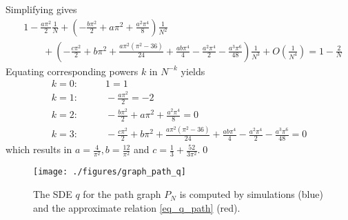 \documentclass{comnet}%
\begin{document}
Simplifying gives
\begin{align*}
	&1 - \frac{a \pi^2}{2} \frac{1}{N} + \left( -\frac{b \pi^2}{2} + a \pi^2 + \frac{a^2 \pi^4}{8} \right) \frac{1}{N^2} \\
	&\qquad + \left( -\frac{c \pi^2}{2} + b \pi^2 + \frac{a\pi^2(\pi^2-36)}{24} + \frac{ab\pi^4}{4} - \frac{a^2 \pi^4}{2} - \frac{a^3 \pi^6}{48} \right) \frac{1}{N^3} + O\left(\frac{1}{N^4}\right) = 1 - \frac{2}{N}
\end{align*}
Equating corresponding powers $k$ in $N^{-k}$ yields
\begin{align*}
	k=0: &\qquad 1 = 1 \\
	k=1: &\qquad -\frac{a \pi^2}{2} = -2 \\
	k=2: &\qquad -\frac{b \pi^2}{2} + a \pi^2 + \frac{a^2 \pi^4}{8} = 0 \\
	k=3: &\qquad -\frac{c \pi^2}{2} + b \pi^2 + \frac{a\pi^2(\pi^2-36)}{24} + \frac{ab\pi^4}{4} - \frac{a^2 \pi^4}{2} - \frac{a^3 \pi^6}{48} = 0
\end{align*}
which results in $a = \frac{4}{\pi^2}, b= \frac{12}{\pi^2}$ and $c=\frac{1}{3} + \frac{52}{3\pi^{2}}$.\hfill\qed


\begin{figure}[H]
	\centering
	\texttt{[image: ./figures/graph\_path\_q]}
	\caption{The SDE $q$ for the path graph $P_N$ is computed by simulations (blue) and the approximate relation \eqref{eq_q_path} (red).}
	\label{fig_path_graph_q}
\end{figure}

\end{document}

